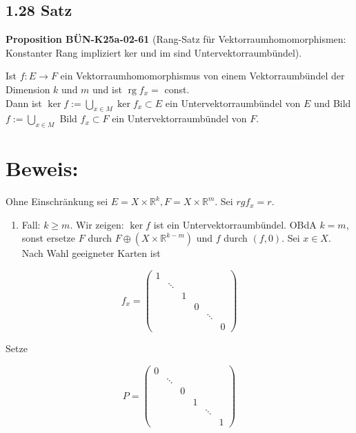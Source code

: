 \documentclass[10pt, letterpaper]{article}
\newcommand{\CustomHeading}[3]{%
  \par\medskip\noindent%
  \textbf{#1 #2} \textnormal{(#3)}.\enskip%
}
\newenvironment{PROP}[2]{\begin{unitbox}\CustomHeading{Proposition}{#1}{#2}}{\end{unitbox}}
\begin{document}
\subsection*{1.28 Satz}

\begin{PROP}{BÜN-K25a-02-61}{Rang-Satz für Vektorraumhomomorphismen: Konstanter Rang impliziert ker und im sind Untervektorraumbündel}
Ist $f: E \rightarrow F$ ein Vektorraumhomomorphismus von einem Vektorraumbündel der Dimension $k$ und $m$ und ist $\operatorname{rg} f_{x}=$ const.\\
Dann ist $\operatorname{ker} f:=\bigcup_{x \in M} \operatorname{ker} f_{x} \subset E$ ein Untervektorraumbündel von $E$ und Bild $f:=\bigcup_{x \in M}$ Bild $f_{x} \subset F$ ein Untervektorraumbündel von $F$.
\end{PROP}

\section*{Beweis:}
Ohne Einschränkung sei $E=X \times \mathbb{R}^{k}, F=X \times \mathbb{R}^{m}$. Sei $r g f_{x}=r$.

\begin{enumerate}
  \item Fall: $k \geq m$. Wir zeigen: $\operatorname{ker} f$ ist ein Untervektorraumbündel. OBdA $k=m$, sonst ersetze $F$ durch $F \oplus\left(X \times \mathbb{R}^{k-m}\right)$ und $f$ durch $(f, 0)$. Sei $x \in X$. Nach Wahl geeigneter Karten ist
\end{enumerate}

$$
f_{x}=\left(\begin{array}{cccccc}
1 & & & & & \\
& \ddots & & & & \\
& & 1 & & & \\
& & & 0 & & \\
& & & & \ddots & \\
& & & & & 0
\end{array}\right)
$$

Setze

$$
P=\left(\begin{array}{cccccc}
0 & & & & & \\
& \ddots & & & & \\
& & 0 & & & \\
& & & 1 & & \\
& & & & \ddots & \\
& & & & & 1
\end{array}\right)
$$
\end{document}
